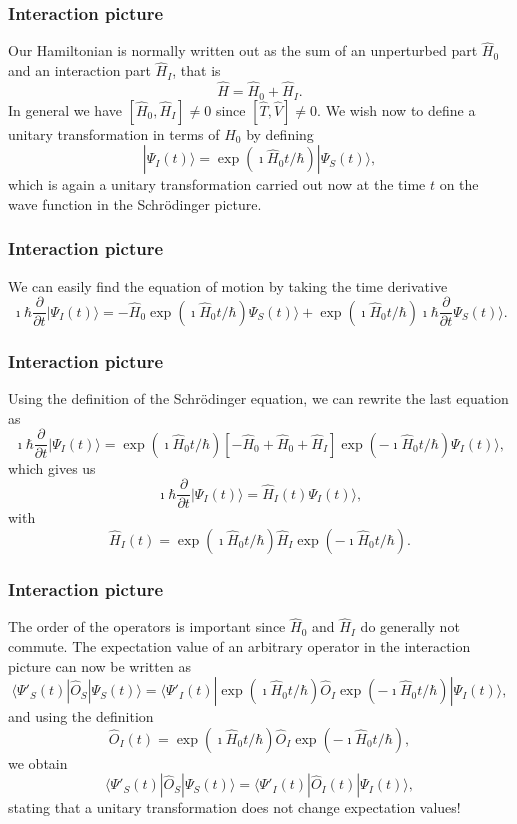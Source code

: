 \frame
{
\frametitle{Interaction picture}
\begin{small}
{\scriptsize
Our Hamiltonian is normally written out as the sum of an unperturbed part $\hat{H}_0$ and an interaction part $\hat{H}_I$, that is
\[
\hat{H}=\hat{H}_0+\hat{H}_I.
\]
In general we have $[\hat{H}_0,\hat{H}_I]\ne 0$ since $[\hat{T},\hat{V}]\ne 0$.
We wish now to define a unitary transformation in terms of $\hat{H}_0$ by defining
\[
|\Psi_I(t)\rangle = \exp{(\imath\hat{H}_0t/\hbar)}|\Psi_S(t)\rangle,
\]
which is again a unitary transformation carried out now at the time $t$ on the 
wave function in the Schr\"odinger picture. 
}
\end{small}
}
\frame
{
\frametitle{Interaction picture}
\begin{small}
{\scriptsize
We can easily find the equation of motion by taking the time derivative
\[
\imath \hbar\frac{\partial }{\partial t}|\Psi_I(t)\rangle = -\hat{H}_0\exp{(\imath\hat{H}_0t/\hbar)}\Psi_S(t)\rangle+\exp{(\imath\hat{H}_0t/\hbar)}
\imath \hbar\frac{\partial }{\partial t}\Psi_S(t)\rangle.
\]
}
\end{small}
}
\frame
{
\frametitle{Interaction picture}
\begin{small}
{\scriptsize
Using the definition of the Schr\"odinger equation, we can rewrite the last equation as 
\[
\imath \hbar\frac{\partial }{\partial t}|\Psi_I(t)\rangle = \exp{(\imath\hat{H}_0t/\hbar)}\left[-\hat{H}_0+\hat{H}_0+\hat{H}_I\right]\exp{(-\imath\hat{H}_0t/\hbar)}\Psi_I(t)\rangle,
\]
which gives us
\[
\imath \hbar\frac{\partial }{\partial t}|\Psi_I(t)\rangle = \hat{H}_I(t)\Psi_I(t)\rangle,
\]
 with 
\[
\hat{H}_I(t)=
\exp{(\imath\hat{H}_0t/\hbar)}\hat{H}_I\exp{(-\imath\hat{H}_0t/\hbar)}.
\]
}
\end{small}
}
\frame
{
\frametitle{Interaction picture}
\begin{small}
{\scriptsize
The order of the operators is important since $\hat{H}_0$ and $\hat{H}_I$ do generally not commute.
The expectation value of
an arbitrary operator in the interaction picture can now be written as
\[
\langle \Psi'_S(t)|\hat{O}_S|\Psi_S(t)\rangle = 
\langle \Psi'_I(t) |\exp{(\imath\hat{H}_0t/\hbar)}\hat{O}_I
\exp{(-\imath\hat{H}_0t/\hbar)}|\Psi_I(t)\rangle,
\]
and using the definition
\[
\hat{O}_I(t)=
\exp{(\imath\hat{H}_0t/\hbar)}\hat{O}_I\exp{(-\imath\hat{H}_0t/\hbar)},
\]
we obtain
\[
\langle \Psi'_S(t)|\hat{O}_S|\Psi_S(t)\rangle = 
\langle \Psi'_I(t) |\hat{O}_I(t)|\Psi_I(t)\rangle,
\]
stating that a unitary transformation does not change expectation values!
}
\end{small}
}
